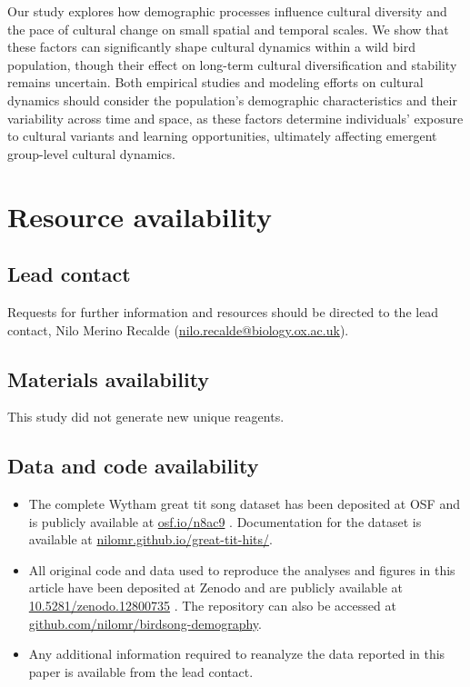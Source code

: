 \documentclass[9pt, onecolumn, twoside, lineno]{gsajnl}
\begin{document}
Our study explores how demographic processes influence cultural diversity and the pace of cultural change on small spatial and temporal scales. We show that these factors can significantly shape cultural dynamics within a wild bird population, though their effect on long-term cultural diversification and stability remains uncertain. Both empirical studies and modeling efforts on cultural dynamics should consider the population's demographic characteristics and their variability across time and space, as these factors determine individuals' exposure to cultural variants and learning opportunities, ultimately affecting emergent group-level cultural dynamics.

\section{Resource availability}

\subsection{Lead contact}
Requests for further information and resources should be directed to the lead contact, Nilo Merino Recalde (\href{mailto:nilo.recalde@biology.ox.ac.uk}{nilo.recalde@biology.ox.ac.uk}).

\subsection{Materials availability}
This study did not generate new unique reagents.

\subsection{Data and code availability}
\begin{itemize}
    \item The complete Wytham great tit song dataset has been deposited at OSF and is publicly available at \href{https://osf.io/n8ac9}{osf.io/n8ac9} \autocite{nilo_gretidataset_osf_2023}. Documentation for the dataset is available at \href{https://nilomr.github.io/great-tit-hits/}{nilomr.github.io/great-tit-hits/}.
    \item All original code and data used to reproduce the analyses and figures in this article have been deposited at Zenodo and are publicly available at \href{https://zenodo.org/records/12800736}{10.5281/zenodo.12800735} \autocite{merino_recalde_2024_songdemo_code}. The repository can also be accessed at \href{https://github.com/nilomr/birdsong-demography}{github.com/nilomr/birdsong-demography}.
    \item Any additional information required to reanalyze the data reported in this paper is available from the lead contact.
\end{itemize}
\end{document}
